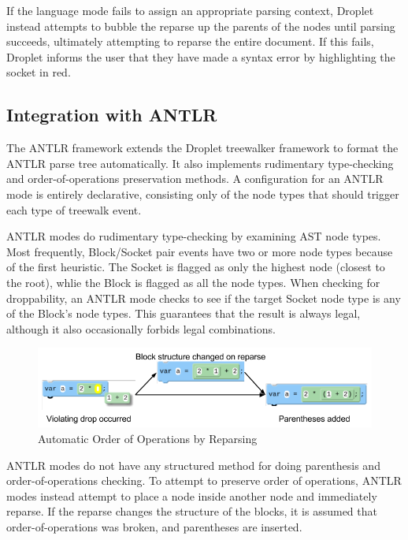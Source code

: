\documentclass[conference]{IEEEtran}
\begin{document}
If the language mode fails to assign an appropriate parsing context, Droplet instead attempts to bubble the reparse up the parents of the nodes until parsing succeeds, ultimately attempting to reparse the entire document. If this fails, Droplet informs the user that they have made a syntax error by highlighting the socket in red.

\subsection{Integration with ANTLR}
The ANTLR framework extends the Droplet treewalker framework to format the ANTLR parse tree automatically. It also implements rudimentary type-checking and order-of-operations preservation methods. A configuration for an ANTLR mode is entirely declarative, consisting only of the node types that should trigger each type of treewalk event.

ANTLR modes do rudimentary type-checking by examining AST node types. Most frequently, Block/Socket pair events have two or more node types because of the first heuristic. The Socket is flagged as only the highest node (closest to the root), whlie the Block is flagged as all the node types. When checking for droppability, an ANTLR mode checks to see if the target Socket node type is any of the Block's node types. This guarantees that the result is always legal, although it also occasionally forbids legal combinations.

\begin{figure}[!t]
\centering
\includegraphics[width=5in]{autoparen.png}
\caption{Automatic Order of Operations by Reparsing}
\label{fig_sim}
\end{figure}

ANTLR modes do not have any structured method for doing parenthesis and order-of-operations checking. To attempt to preserve order of operations, ANTLR modes instead attempt to place a node inside another node and immediately reparse. If the reparse changes the structure of the blocks, it is assumed that order-of-operations was broken, and parentheses are inserted.
\end{document}
